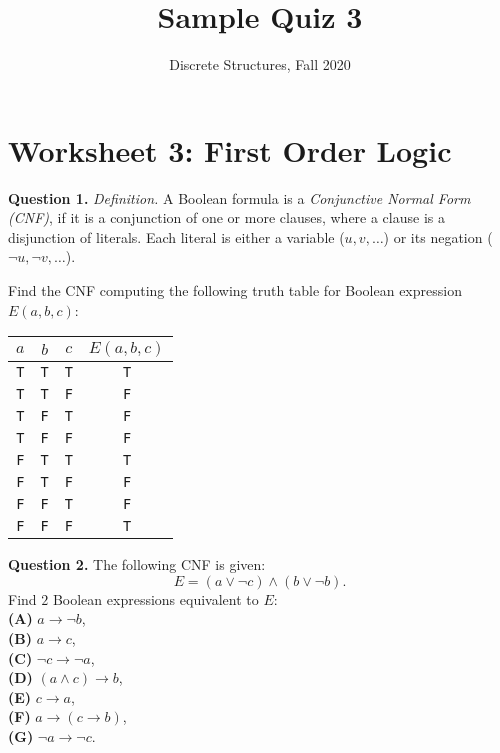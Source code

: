 \documentclass[jou]{apa6}
\title{Sample Quiz 3}
\author{Discrete Structures, Fall 2020}
\affiliation{RBS}
\begin{document}
\twocolumn

\section{Worksheet 3: First Order Logic}


\vspace{6pt}
{\bf Question 1.} {\em Definition.} A Boolean formula is a 
{\em Conjunctive Normal Form (CNF)}, 
if it is a conjunction of one or more clauses, 
where a clause is a disjunction of literals. Each literal 
is either a variable ($u,v,\ldots$) or its negation ($\neg u, \neg v, \ldots$). 

Find the CNF computing the following truth table for Boolean 
expression $E(a,b,c)$:\\
\begin{tabular}{ c | c | c | c }
$a$ & $b$ & $c$ & $E(a,b,c)$  \\ \hline
{\tt T} & {\tt T} & {\tt T} & {\tt T} \\ \hline
{\tt T} & {\tt T} & {\tt F} & {\tt F} \\ \hline
{\tt T} & {\tt F} & {\tt T} & {\tt F} \\ \hline
{\tt T} & {\tt F} & {\tt F} & {\tt F} \\ \hline
{\tt F} & {\tt T} & {\tt T} & {\tt T} \\ \hline
{\tt F} & {\tt T} & {\tt F} & {\tt F} \\ \hline
{\tt F} & {\tt F} & {\tt T} & {\tt F} \\ \hline
{\tt F} & {\tt F} & {\tt F} & {\tt T} \\ \hline
\end{tabular}




\vspace{6pt}
{\bf Question 2.} The following CNF is given:
$$E = (a \vee \neg c) \wedge (b \vee \neg b).$$
Find $2$ Boolean expressions equivalent to $E$:\\[3pt]
{\bf (A)} $a \rightarrow \neg b$,\\[3pt]
{\bf (B)} $a \rightarrow c$,\\[3pt]
{\bf (C)} $\neg c \rightarrow \neg a$,\\[3pt]
{\bf (D)} $(a \wedge c) \rightarrow b$,\\[3pt]
{\bf (E)} $c \rightarrow a$,\\[3pt]
{\bf (F)} $a \rightarrow (c \rightarrow b)$,\\[3pt]
{\bf (G)} $\neg a \rightarrow \neg c$.
\end{document}
